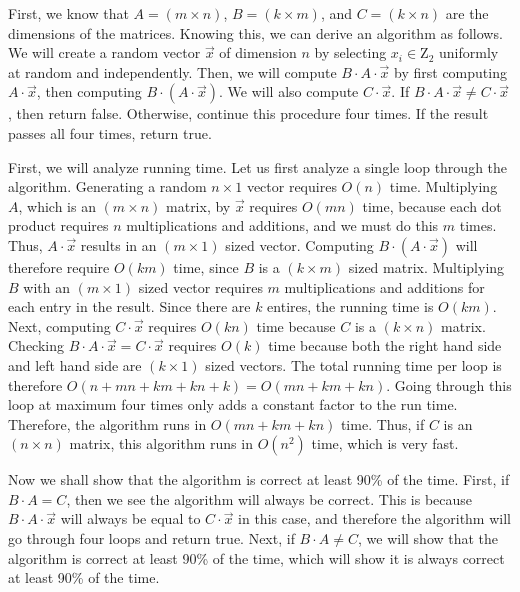 \documentclass[psamsfonts]{amsart}
\newenvironment{sol}{{\bfseries Solution}}{\qedsymbol}
\theoremstyle{definition}
\theoremstyle{remark}
\numberwithin{equation}{section}
\begin{document}
\begin{sol}
First, we know that $A = (m \times n)$, $B = (k \times m)$, and $C = (k \times n)$ are the dimensions of the matrices. Knowing this, we can derive an algorithm as follows. We will create a random vector $\vec{x}$ of dimension $n$ by selecting $x_i \in \mathrm{Z}_2$ uniformly at random and independently. Then, we will compute $B \cdot A \cdot \vec{x}$ by first computing $A \cdot \vec{x}$, then computing $B \cdot (A \cdot \vec{x})$. We will also compute $C \cdot \vec{x}$. If $B \cdot A \cdot \vec{x} \neq C \cdot \vec{x}$, then return false. Otherwise, continue this procedure four times. If the result passes all four times, return true. 

First, we will analyze running time. Let us first analyze a single loop through the algorithm. Generating a random $n \times 1$ vector requires $O(n)$ time. Multiplying $A$, which is an $(m \times n)$ matrix, by $\vec{x}$ requires $O(mn)$ time, because each dot product requires $n$ multiplications and additions, and we must do this $m$ times. Thus, $A \cdot \vec{x}$ results in an $(m \times 1)$ sized vector. Computing $B \cdot (A \cdot \vec{x})$ will therefore require $O(km)$ time, since $B$ is a $(k \times m)$ sized matrix. Multiplying $B$ with an $(m \times 1)$ sized vector requires $m$ multiplications and additions for each entry in the result. Since there are $k$ entires, the running time is $O(km)$. Next, computing $C \cdot \vec{x}$ requires $O(kn)$ time because $C$ is a $(k \times n)$ matrix. Checking $B \cdot A \cdot \vec{x} = C \cdot \vec{x}$ requires $O(k)$ time because both the right hand side and left hand side are $(k \times 1)$ sized vectors. The total running time per loop is therefore $O(n + mn + km + kn + k) = O(mn + km + kn)$. Going through this loop at maximum four times only adds a constant factor to the run time. Therefore, the algorithm runs in $O(mn + km + kn)$ time. Thus, if $C$ is an $(n \times n)$ matrix, this algorithm runs in $O(n^2)$ time, which is very fast.

Now we shall show that the algorithm is correct at least 90\% of the time. First, if $B \cdot A = C$, then we see the algorithm will always be correct. This is because $B \cdot A \cdot \vec{x}$ will always be equal to $C \cdot \vec{x}$ in this case, and therefore the algorithm will go through four loops and return true. Next, if $B \cdot A \neq C$, we will show that the algorithm is correct at least 90\% of the time, which will show it is always correct at least 90\% of the time.


\end{sol}
\end{document}
